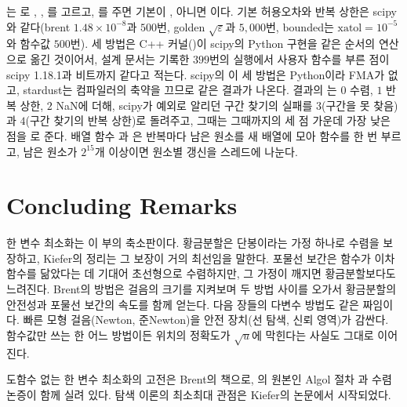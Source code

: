 \begin{instardust}
는 로 , , 를 고르고, 를 주면 기본이 , 아니면 이다. 기본 허용오차와 반복 상한은 scipy와 같다(brent $1.48\times10^{-8}$과 $500$번, golden $\sqrt\varepsilon$과 $5{,}000$번, bounded는 $\mathrm{xatol}=10^{-5}$와 함수값 $500$번). 세 방법은 C++ 커널()이 scipy의 Python 구현을 같은 순서의 연산으로 옮긴 것이어서, 설계 문서는 기록한 $399$번의 실행에서 사용자 함수를 부른 점이 scipy 1.18.1과 비트까지 같다고 적는다. scipy의 이 세 방법은 Python이라 FMA가 없고, stardust는 컴파일러의 축약을 끄므로 같은 결과가 나온다. 결과의 는 $0$ 수렴, $1$ 반복 상한, $2$ NaN에 더해, scipy가 예외로 알리던 구간 찾기의 실패를 $3$(구간을 못 찾음)과 $4$(구간 찾기의 반복 상한)로 돌려주고, 그때는 그때까지의 세 점 가운데 가장 낮은 점을 로 준다. 배열 함수 과 은 반복마다 남은 원소를 새 배열에 모아 함수를 한 번 부르고, 남은 원소가 $2^{15}$개 이상이면 원소별 갱신을 스레드에 나눈다.
\end{instardust}

\section{Concluding Remarks}

한 변수 최소화는 이 부의 축소판이다. 황금분할은 단봉이라는 가정 하나로 수렴을 보장하고, Kiefer의 정리는 그 보장이 거의 최선임을 말한다. 포물선 보간은 함수가 이차 함수를 닮았다는 데 기대어 초선형으로 수렴하지만, 그 가정이 깨지면 황금분할보다도 느려진다. Brent의 방법은 걸음의 크기를 지켜보며 두 방법 사이를 오가서 황금분할의 안전성과 포물선 보간의 속도를 함께 얻는다. 다음 장들의 다변수 방법도 같은 짜임이다. 빠른 모형 걸음(Newton, 준Newton)을 안전 장치(선 탐색, 신뢰 영역)가 감싼다. 함수값만 쓰는 한 어느 방법이든 위치의 정확도가 $\sqrt u$에 막힌다는 사실도 그대로 이어진다.

도함수 없는 한 변수 최소화의 고전은 Brent의 책\cite{brent1973}으로, 의 원본인 Algol 절차 과 수렴 논증이 함께 실려 있다. 탐색 이론의 최소최대 관점은 Kiefer의 논문\cite{kiefer1953}에서 시작되었다.

\chapterreferences
